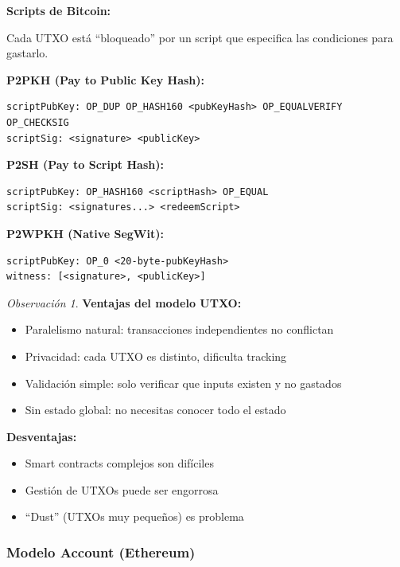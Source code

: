 \documentclass[11pt,a4paper,twoside,openright]{book}
\theoremstyle{definition}
\theoremstyle{plain}
\theoremstyle{remark}
\newtheorem{remark}{Observación}[chapter]
\begin{document}
\begin{keyidea}
\textbf{Scripts de Bitcoin:}

Cada UTXO está ``bloqueado'' por un script que especifica las condiciones para gastarlo.

\textbf{P2PKH (Pay to Public Key Hash):}
\begin{verbatim}
scriptPubKey: OP_DUP OP_HASH160 <pubKeyHash> OP_EQUALVERIFY OP_CHECKSIG
scriptSig: <signature> <publicKey>
\end{verbatim}

\textbf{P2SH (Pay to Script Hash):}
\begin{verbatim}
scriptPubKey: OP_HASH160 <scriptHash> OP_EQUAL
scriptSig: <signatures...> <redeemScript>
\end{verbatim}

\textbf{P2WPKH (Native SegWit):}
\begin{verbatim}
scriptPubKey: OP_0 <20-byte-pubKeyHash>
witness: [<signature>, <publicKey>]
\end{verbatim}
\end{keyidea}

\begin{remark}
\textbf{Ventajas del modelo UTXO:}
\begin{itemize}
    \item Paralelismo natural: transacciones independientes no conflictan
    \item Privacidad: cada UTXO es distinto, dificulta tracking
    \item Validación simple: solo verificar que inputs existen y no gastados
    \item Sin estado global: no necesitas conocer todo el estado
\end{itemize}

\textbf{Desventajas:}
\begin{itemize}
    \item Smart contracts complejos son difíciles
    \item Gestión de UTXOs puede ser engorrosa
    \item ``Dust'' (UTXOs muy pequeños) es problema
\end{itemize}
\end{remark}

\subsubsection{Modelo Account (Ethereum)}
\end{document}
